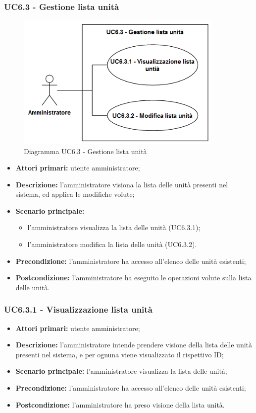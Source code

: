 \subsubsection{UC6.3 - Gestione lista unità}
	\begin{figure}[H]
		\centering
		\includegraphics[width=10cm]{images/UC6.3.png}
		\caption{Diagramma UC6.3 - Gestione lista unità}
	\end{figure}
	\begin{itemize}
		\item \textbf{Attori primari:} utente amministratore;
		\item \textbf{Descrizione:} l'amministratore visiona la lista delle unità presenti nel sistema, ed applica le modifiche volute;
		\item \textbf{Scenario principale:} 
			\begin{itemize}
				\item l'amministratore visualizza la lista delle unità (UC6.3.1);
				\item l'amministratore modifica la lista delle unità (UC6.3.2).
			\end{itemize}
		\item \textbf{Precondizione:} l'amministratore ha accesso all'elenco delle unità esistenti;
		\item \textbf{Postcondizione:} l'amministratore ha eseguito le operazioni volute sulla lista delle unità.
	\end{itemize}

\subsubsection{UC6.3.1 - Visualizzazione lista unità}
\begin{itemize}
	\item \textbf{Attori primari:} utente amministratore;
	\item \textbf{Descrizione:} l'amministratore intende prendere visione della lista delle unità presenti nel sistema, e per ognuna viene visualizzato il rispettivo ID;
	\item \textbf{Scenario principale:} l'amministratore visualizza la lista delle unità;
	\item \textbf{Precondizione:} l'amministratore ha accesso all'elenco delle unità esistenti;
	\item \textbf{Postcondizione:} l'amministratore ha preso visione della lista unità.
\end{itemize}

